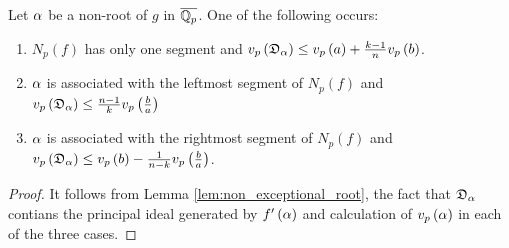 \documentclass[../main.tex]{subfiles}
\begin{document}
\begin{corollary}
  \label{cor:valuation_of_different}
  Let $\alpha$ be a non-\ex root of $g$ in $\overline{\mathbb{Q}_p}$.
  One of the following occurs:
  \begin{enumerate}
    \item $N_p\left( f \right)$ has only one segment and $v_p\left( \mathfrak{D}_\alpha \right) \leq v_p\left( a \right) + \frac{k - 1}{n}v_p\left( b \right)$.
    \item $\alpha$ is associated with the leftmost segment of $N_p\left( f \right)$ and $v_p\left( \mathfrak{D}_\alpha \right) \leq \frac{n - 1}{k} v_p\left( \frac{b}{a} \right)$
    \item $\alpha$ is associated with the rightmost segment of $N_p\left( f \right)$ and $v_p\left( \mathfrak{D}_\alpha \right) \leq v_p\left( b \right) - \frac{1}{n - k} v_p\left( \frac{b}{a} \right)$.
  \end{enumerate}
\end{corollary}
\begin{proof}
  It follows from Lemma \ref{lem:non_exceptional_root}, the fact that $\mathfrak{D}_\alpha$ contians the principal ideal generated by $f'\left( \alpha \right)$ and calculation of $v_p\left( \alpha \right)$ in each of the three cases.
\end{proof}
\end{document}
